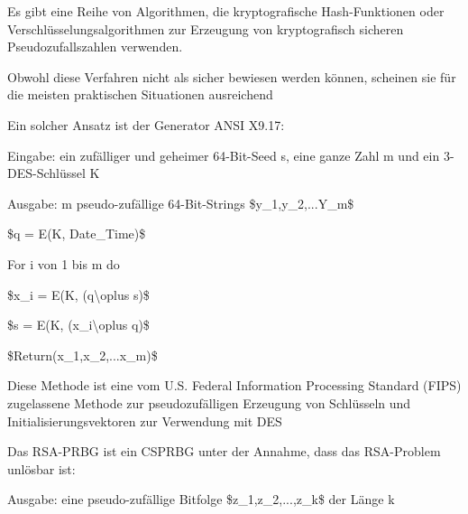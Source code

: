 \documentclass[a4paper]{article}
\begin{document}
\begin{multicols}{3}
      \begin{itemize*}
            \item Es gibt eine Reihe von Algorithmen, die kryptografische
            Hash-Funktionen oder Verschlüsselungsalgorithmen zur Erzeugung von
            kryptografisch sicheren Pseudozufallszahlen verwenden.
            \begin{itemize*}
                  \item Obwohl diese Verfahren nicht als sicher bewiesen werden können, scheinen sie für die meisten praktischen Situationen ausreichend
            \end{itemize*}
            \item Ein solcher Ansatz ist der Generator ANSI X9.17:
            \begin{itemize*}
                  \item Eingabe: ein zufälliger und geheimer 64-Bit-Seed s, eine ganze Zahl m und ein 3-DES-Schlüssel K
                  \item Ausgabe: m pseudo-zufällige 64-Bit-Strings \$y\_1,y\_2,...Y\_m\$
                  \begin{enumerate*} \def\labelenumi{\arabic{enumi}.} \item \$q = E(K, Date\_Time)\$ \item For i von 1 bis m do
                        \begin{enumerate*} \def\labelenumii{\arabic{enumii}.} \item \$x\_i = E(K, (q\textbackslash oplus s)\$ \item \$s = E(K, (x\_i\textbackslash oplus q)\$ \end{enumerate*} \item \$Return(x\_1,x\_2,...x\_m)\$ \end{enumerate*}
                  \item Diese Methode ist eine vom U.S. Federal Information Processing Standard (FIPS) zugelassene Methode zur pseudozufälligen Erzeugung von Schlüsseln und Initialisierungsvektoren zur Verwendung mit DES
            \end{itemize*}
            \item Das RSA-PRBG ist ein CSPRBG unter der Annahme, dass das RSA-Problem
            unlösbar ist:
            \begin{itemize*}
                  \item Ausgabe: eine pseudo-zufällige Bitfolge \$z\_1,z\_2,...,z\_k\$ der Länge k
            \end{itemize*}

\end{itemize*}
\end{multicols}
\end{document}
